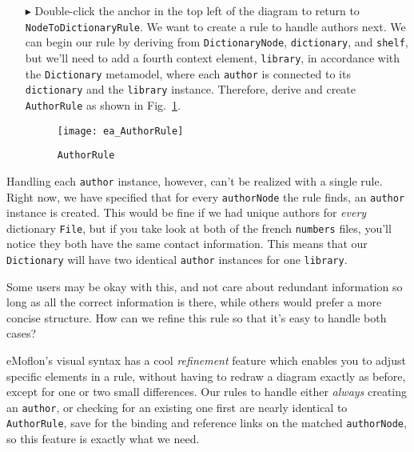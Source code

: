 \begin{itemize}
\item[$\blacktriangleright$] Double-click the anchor in the top left of the diagram to return to \texttt{NodeToDictionaryRule}. We want to create a rule to
handle authors next. We can begin our rule by deriving from \texttt{DictionaryNode}, \texttt{dictionary}, and \texttt{shelf}, but we'll need to add a fourth
context element, \texttt{library}, in accordance with the \texttt{Dictionary} metamodel, where each \texttt{author} is connected to its \texttt{dictionary} and
the \texttt{library} instance. Therefore, derive and create \texttt{AuthorRule} as shown in Fig.~\ref{ea:AuthorRule}.

\newpage

\begin{figure}[h]
  \hspace{-2cm}
  \texttt{[image: ea\_AuthorRule]}
  \caption{\texttt{AuthorRule} \update}
  \label{ea:AuthorRule}
\end{figure}

\end{itemize}

Handling each \texttt{author} instance, however, can't be realized with a single rule. Right now, we have specified that for every \texttt{authorNode} the
rule finds, an \texttt{author} instance is created. This would be fine if we had unique authors for \emph{every} dictionary \texttt{File}, but if you take look
at both of the french \texttt{numbers} files, you'll notice they both have the same contact information. This means that our \texttt{Dictionary} will have two
identical \texttt{author} instances for one \texttt{library}.

Some users may be okay with this, and not care about redundant information so long as all the correct information is there, while others would prefer a
more concise structure. How can we refine this rule so that it's easy to handle both cases?

eMoflon's visual syntax has a cool \emph{refinement} feature which enables you to adjust specific elements in a rule, without having to redraw a
diagram exactly as before, except for one or two small differences. Our rules to handle either \emph{always} creating an \texttt{author}, or checking for an
existing one first are nearly identical to \texttt{AuthorRule}, save for the binding and reference links on the matched \texttt{authorNode}, so this feature is
exactly what we need.

